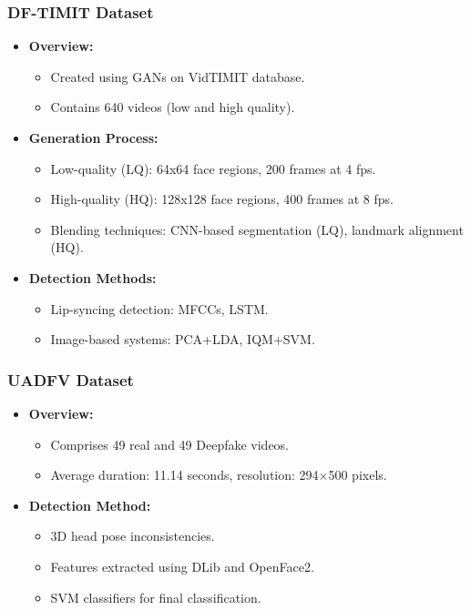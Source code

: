 \documentclass{beamer}
\begin{document}
\begin{frame}
    \frametitle{DF-TIMIT Dataset}
    \begin{itemize}
        \item \textbf{Overview:}
            \begin{itemize}
                \item Created using GANs on VidTIMIT database.
                \item Contains 640 videos (low and high quality).
            \end{itemize}
        \item \textbf{Generation Process:}
            \begin{itemize}
                \item Low-quality (LQ): 64x64 face regions, 200 frames at 4 fps.
                \item High-quality (HQ): 128x128 face regions, 400 frames at 8 fps.
                \item Blending techniques: CNN-based segmentation (LQ), landmark alignment (HQ).
            \end{itemize}
        \item \textbf{Detection Methods:}
            \begin{itemize}
                \item Lip-syncing detection: MFCCs, LSTM.
                \item Image-based systems: PCA+LDA, IQM+SVM.
            \end{itemize}
    \end{itemize}
\end{frame}

\begin{frame}
    \frametitle{UADFV Dataset}
    \begin{itemize}
        \item \textbf{Overview:}
            \begin{itemize}
                \item Comprises 49 real and 49 Deepfake videos.
                \item Average duration: 11.14 seconds, resolution: 294×500 pixels.
            \end{itemize}
        \item \textbf{Detection Method:}
            \begin{itemize}
                \item 3D head pose inconsistencies.
                \item Features extracted using DLib and OpenFace2.
                \item SVM classifiers for final classification.
            \end{itemize}
    \end{itemize}
\end{frame}
\end{document}
